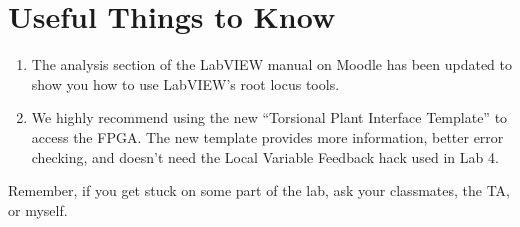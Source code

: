 \section{Useful Things to Know}

\begin{enumerate}
\item The analysis section of the LabVIEW manual on Moodle has been updated
to show you how to use LabVIEW's root locus tools.  

\item We highly recommend using the new ``Torsional Plant Interface
Template'' to access the FPGA.  The new template provides more information,
better error checking, and doesn't need the Local Variable Feedback
hack used in Lab 4.
\end{enumerate}

\vspace{0.2in}

\noindent Remember, if you get stuck on some part of the lab, ask your
classmates, the TA, or myself.


